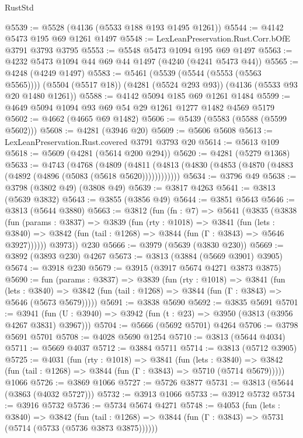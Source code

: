 \begin{lexlean}{RustStd}
\begin{coremodule}
{\begin{coremodule}
{{{{{{{{{{{{{{{{{{{{{{{{{{{{{{{{{{{@5539 := @5528 (@4136 (@5533 @188 @193 @1495 @1261))
@5544 := @4142 @5473 @195 @69 @1261 @1497
@5548 := LexLeanPreservation.Rust.Corr.bOfE @3791 @3793 @3795
@5553 := @5548 @5473 @1094 @195 @69 @1497
@5563 := @4232 @5473 @1094 @44 @69 @44 @1497 (@4240 (@4241 @5473 @44))
@5565 := @4248 (@4249 @1497)
@5583 := @5461
    (@5539 (@5544 (@5553 (@5563 @5565))))
    (@5504 (@5517 @18))
    (@4281 (@5524 @293 @93))
    (@4136 (@5533 @93 @20 @1480 @1261))
@5588 := @4142 @5094 @185 @69 @1261 @1484
@5599 := @4649 @5094 @1094 @93 @69 @54 @29 @1261 @1277 @1482 @4569 @5179
@5602 := @4662 (@4665 @69 @1482)
@5606 := @5439 (@5583 (@5588 (@5599 @5602)))
@5608 := @4281 (@3946 @20)
@5609 := @5606 @5608
@5613 := LexLeanPreservation.Rust.covered @3791 @3793 @20
@5614 := @5613 @109
@5618 := @5609 (@4281 (@5614 @200 @294))
@5620 := @4281 (@5279 @1368)
@5633 := @4743
    (@4768
      (@4809 (@4811 (@4813 (@4830 (@4853 (@4870 (@4883 (@4892 (@4896 (@5083 (@5618 @5620))))))))))))
@5634 := @3796 @49
@5638 := @3798 (@3802 @49) (@3808 @49)
@5639 := @3817 @4263
@5641 := @3813 (@5639 @3832)
@5643 := @3855 (@3856 @49)
@5644 := @3851 @5643
@5646 := @3813 (@5644 @3880)
@5663 := @3812
    (fun (fn : @7) =>
    @5641
      (@3835
        (@3838
          (fun (params : @3837) =>
          @3839
            (fun (rty : @1018) =>
            @3841
              (fun (lets : @3840) =>
              @3842 (fun (tail : @1268) => @3844 (fun (Γ : @3843) => @5646 @3927))))))
        @3973))
    @230
@5666 := @3979 (@5639 (@3830 @230))
@5669 := @3892 (@3893 @230) @4267
@5673 := @3813 (@3884 (@5669 @3901) @3905)
@5674 := @3918 @230
@5679 := @3915 (@3917 @5674 @4271 @3873 @3875)
@5690 := fun (params : @3837) =>
  @3839
    (fun (rty : @1018) =>
    @3841
      (fun (lets : @3840) =>
      @3842 (fun (tail : @1268) => @3844 (fun (Γ : @3843) => @5646 (@5673 @5679)))))
@5691 := @3838 @5690
@5692 := @3835 @5691
@5701 := @3941 (fun (U : @3940) => @3942 (fun (t : @23) => @3950 (@3813 (@3956 @4267 @3831) @3967)))
@5704 := @5666 (@5692 @5701) @4264
@5706 := @3798 @5691 @5701
@5708 := @4028 @5690 @1254
@5710 := @3813 (@5644 @4034)
@5711 := @5669 @4037
@5712 := @3884 @5711
@5714 := @3813 (@5712 @3905)
@5725 := @4031
    (fun (rty : @1018) =>
    @3841
      (fun (lets : @3840) =>
      @3842 (fun (tail : @1268) => @3844 (fun (Γ : @3843) => @5710 (@5714 @5679)))))
    @1066
@5726 := @3869 @1066
@5727 := @5726 @3877
@5731 := @3813 (@5644 (@3863 (@4032 @5727)))
@5732 := @3913 @1066
@5733 := @3912 @5732
@5734 := @3916 @5732
@5736 := @5734 @5674 @4271
@5748 := @4053
    (fun (lets : @3840) =>
    @3842
      (fun (tail : @1268) => @3844 (fun (Γ : @3843) => @5731 (@5714 (@5733 (@5736 @3873 @3875))))))
}}}}}}}}}}}}}}}}}}}}}}}}}}}}}}}}}}}
\end{coremodule}}
\end{coremodule}
\end{lexlean}
